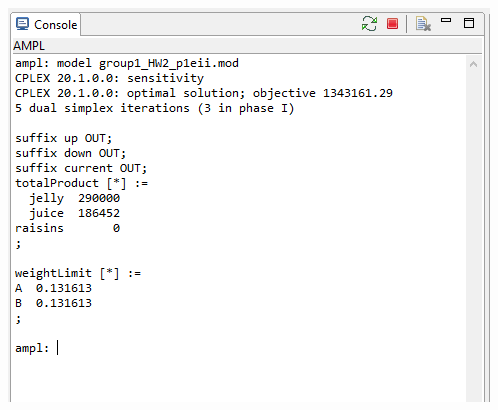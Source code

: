 \documentclass[11pt]{article}
\begin{document}
\begin{enumerate}
\begin{enumerate}
\begin{enumerate}
\includegraphics[width=.9\textwidth]{output1eii.png}


\end{enumerate}
\end{enumerate}
\end{enumerate}
\end{document}
